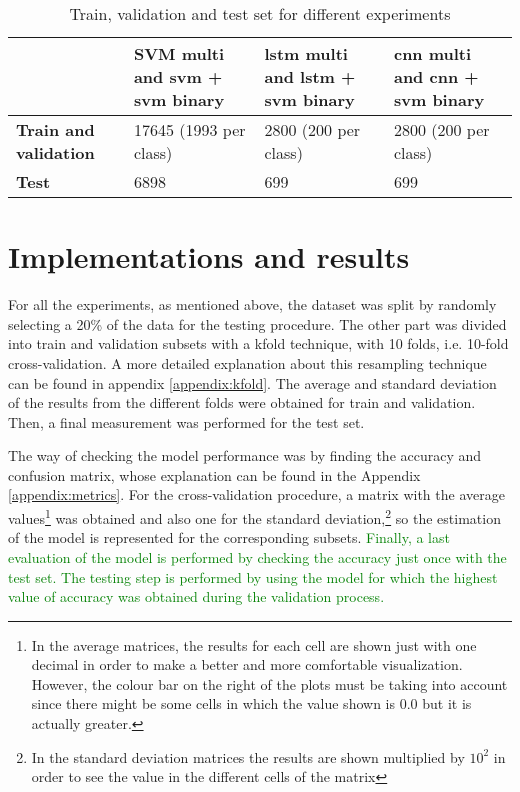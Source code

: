 	
	\begin{table}[H]
		\centering
		\begin{tabular}{|| m{5em} | m{9em} | m{9em} | m{9em} ||}
			\hline
			& \textbf{SVM multi and \acrshort{svm} + \acrshort{svm} binary} & \textbf{\acrshort{lstm} multi and \acrshort{lstm} + \acrshort{svm} binary} & \textbf{\acrshort{cnn} multi and \acrshort{cnn} + \acrshort{svm} binary}  \\
			\hline\hline
			\textbf{Train and validation} & 17645 (1993 per class) & 2800 (200 per class) & 2800 (200 per class) \\
			\hline
			\textbf{Test} & 6898 & 699 & 699 \\
			\hline                    
		\end{tabular}
		\caption{Train, validation and test set for different experiments}
		\label{table:8}
	\end{table}

\section{Implementations and results}

	For all the experiments, as mentioned above, the dataset was split by randomly selecting a 20\% of the data for the testing procedure. The other part was divided into train and validation subsets with a \acrlong{kfold} technique, with 10 folds, i.e. 10-fold cross-validation. A more detailed explanation about this resampling technique can be found in appendix \ref{appendix:kfold}. The average and standard deviation of the results from the different folds were obtained for train and validation. Then, a final measurement was performed for the test set. 
	
	The way of checking the model performance was by finding the accuracy and confusion matrix, whose explanation can be found in the Appendix \ref{appendix:metrics}. For the cross-validation procedure, a matrix with the average values\footnote{In the average matrices, the results for each cell are shown just with one decimal in order to make a better and more comfortable visualization. However, the colour bar on the right of the plots must be taking into account since there might be some cells in which the value shown is $0.0$ but it is actually greater.} was obtained and also one for the standard deviation,\footnote{In the standard deviation matrices the results are shown multiplied by $10^{2}$ in order to see the value in the different cells of the matrix} so the estimation of the model is represented for the corresponding subsets. \textcolor{green}{Finally, a last evaluation of the model is performed by checking the accuracy just once with the test set. The testing step is performed by using the model for which the highest value of accuracy was obtained during the validation process.} 
	
